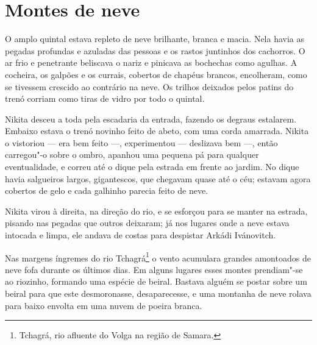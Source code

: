 \chapter{Montes de neve}

O amplo quintal estava repleto de neve brilhante, branca e macia. Nela
havia as pegadas profundas e azuladas das pessoas e os rastos juntinhos
dos cachorros. O ar frio e penetrante beliscava o nariz e pinicava as
bochechas como agulhas. A cocheira, os galpões e os currais, cobertos de
chapéus brancos, encolheram, como se tivessem crescido ao contrário na
neve. Os trilhos deixados pelos patins do trenó corriam como tiras de
vidro por todo o quintal.

Nikita desceu a toda pela escadaria da entrada, fazendo os degraus
estalarem. Embaixo estava o trenó novinho feito de abeto, com uma corda
amarrada. Nikita o vistoriou --- era bem feito ---, experimentou ---
deslizava bem ---, então carregou"-o sobre o ombro, apanhou uma pequena
pá para qualquer eventualidade, e correu até o dique pela estrada em
frente ao jardim. No dique havia salgueiros largos, gigantescos, que
chegavam quase até o céu; estavam agora cobertos de gelo e cada galhinho
parecia feito de neve.

Nikita virou à direita, na direção do rio, e se esforçou para se manter
na estrada, pisando nas pegadas que outros deixaram; já nos lugares onde
a neve estava intocada e limpa, ele andava de costas para despistar
Arkádi Ivánovitch.

Nas margens íngremes do rio Tchagrá\footnote{Tchagrá, rio afluente do
  Volga na região de Samara.} o vento acumulara grandes amontoados de
neve fofa durante os últimos dias. Em alguns lugares esses montes
prendiam"-se ao riozinho, formando uma espécie de beiral. Bastava alguém
se postar sobre um beiral para que este desmoronasse, desaparecesse, e uma
montanha de neve rolava para baixo envolta em uma nuvem de poeira branca.

